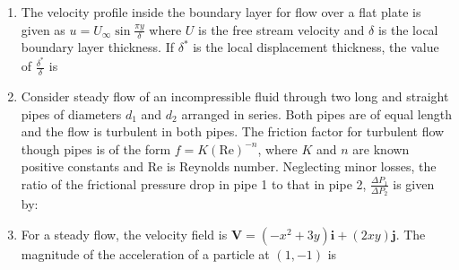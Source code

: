 \documentclass[journal]{IEEEtran}
\begin{document}
\begin{enumerate}[leftmargin=0pt]
    \item The velocity profile inside the boundary layer for flow over a flat plate is given as $u = U_\infty \sin \frac{\pi y}{\delta}$ where $U$ is the free stream velocity and $\delta$ is the local boundary layer thickness. If $\delta^*$ is the local displacement thickness, the value of $\frac{\delta^*}{\delta}$ is
    \begin{enumerate}
    \end{enumerate}

    \item Consider steady flow of an incompressible fluid through two long and straight pipes of diameters $d_1$ and $d_2$ arranged in series. Both pipes are of equal length and the flow is turbulent in both pipes. The friction factor for turbulent flow though pipes is of the form $f = K (\text{Re})^{-n}$, where $K$ and $n$ are known positive constants and Re is Reynolds number. Neglecting minor losses, the ratio of the frictional pressure drop in pipe 1 to that in pipe 2, $\frac{\Delta P_1}{\Delta P_2}$ is given by:
    \begin{enumerate}
    \end{enumerate}

    \item For a steady flow, the velocity field is $\mathbf{V} = (-x^2 + 3y)\mathbf{i} + (2xy)\mathbf{j}$. The magnitude of the acceleration of a particle at $(1, -1)$ is
    \begin{enumerate}
    \end{enumerate}


\end{enumerate}
\end{document}
